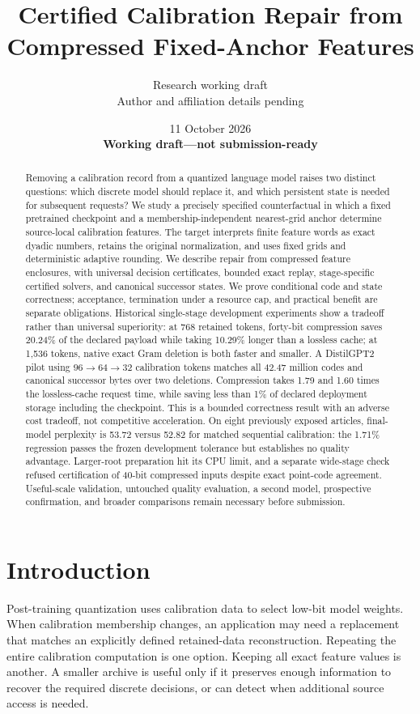 \documentclass[10pt,twocolumn,letterpaper]{article}
\title{Certified Calibration Repair from Compressed Fixed-Anchor Features}
\author{Research working draft\\Author and affiliation details pending}
\date{11 October 2026\\\textbf{Working draft---not submission-ready}}
\begin{document}
\maketitle

\begin{abstract}
Removing a calibration record from a quantized language model raises two distinct
questions: which discrete model should replace it, and which persistent state is
needed for subsequent requests? We study a precisely specified counterfactual in
which a fixed pretrained checkpoint and a membership-independent nearest-grid
anchor determine source-local calibration features. The target interprets finite
feature words as exact dyadic numbers, retains the original normalization, and
uses fixed grids and deterministic adaptive rounding. We describe repair from
compressed feature enclosures, with universal decision certificates, bounded
exact replay, stage-specific certified solvers, and canonical successor states.
We prove conditional code and state correctness; acceptance, termination under a
resource cap, and practical benefit are separate obligations. Historical
single-stage development experiments show a tradeoff rather than universal
superiority: at 768 retained tokens, forty-bit compression saves 20.24\% of the
declared payload while taking 10.29\% longer than a lossless cache; at 1,536 tokens,
native exact Gram deletion is both faster and smaller. A DistilGPT2 pilot using
$96\to64\to32$ calibration tokens matches all 42.47 million codes and canonical
successor bytes over two deletions.
Compression takes 1.79 and 1.60 times the lossless-cache request time, while saving
less than 1\% of declared deployment storage including the checkpoint. This is a
bounded correctness result with an adverse cost tradeoff, not competitive
acceleration. On eight previously exposed articles, final-model perplexity is
53.72 versus 52.82 for matched sequential calibration: the 1.71\% regression
passes the frozen development tolerance but establishes no quality advantage.
Larger-root preparation hit its CPU limit, and a separate wide-stage check
refused certification of 40-bit compressed inputs despite exact point-code agreement.
Useful-scale validation, untouched quality evaluation, a second model,
prospective confirmation, and broader comparisons remain necessary before
submission.
\end{abstract}

\section{Introduction}
Post-training quantization uses calibration data to select low-bit model weights.
When calibration membership changes, an application may need a replacement that
matches an explicitly defined retained-data reconstruction. Repeating the entire
calibration computation is one option. Keeping all exact feature values is
another. A smaller archive is useful only if it preserves enough information to
recover the required discrete decisions, or can detect when additional source
access is needed.
\end{document}
